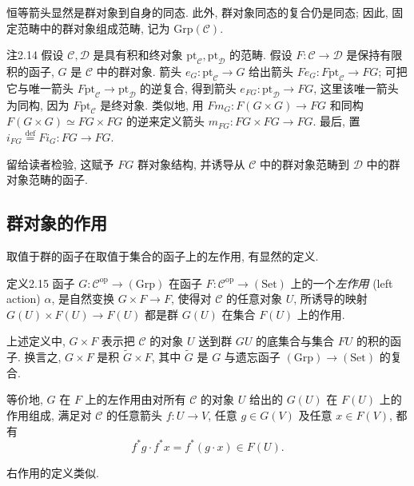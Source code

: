 恒等箭头显然是群对象到自身的同态. 此外, 群对象同态的复合仍是同态; 因此, 固定范畴中的群对象组成范畴, 记为 $\mathrm{Grp}(\mathcal C)$.

\begin{origstatement}{注}{2.14}\label{ch02:rem214}
假设 $\mathcal C,\mathcal D$ 是具有积和终对象 $\mathrm{pt}_{\mathcal C},\mathrm{pt}_{\mathcal D}$ 的范畴. 假设 $F:\mathcal C\to\mathcal D$ 是保持有限积的函子, $G$ 是 $\mathcal C$ 中的群对象. 箭头 $e_G:\mathrm{pt}_{\mathcal C}\to G$ 给出箭头 $Fe_G:F\mathrm{pt}_{\mathcal C}\to FG$; 可把它与唯一箭头 $F\mathrm{pt}_{\mathcal C}\to\mathrm{pt}_{\mathcal D}$ 的逆复合, 得到箭头 $e_{FG}:\mathrm{pt}_{\mathcal D}\to FG$, 这里该唯一箭头为同构, 因为 $F\mathrm{pt}_{\mathcal C}$ 是终对象. 类似地, 用 $Fm_G:F(G\times G)\to FG$ 和同构 $F(G\times G)\simeq FG\times FG$ 的逆来定义箭头 $m_{FG}:FG\times FG\to FG$. 最后, 置 $i_{FG}\overset{\mathrm{def}}=Fi_G:FG\to FG$.

留给读者检验, 这赋予 $FG$ 群对象结构, 并诱导从 $\mathcal C$ 中的群对象范畴到 $\mathcal D$ 中的群对象范畴的函子.
\end{origstatement}

\subsection{群对象的作用}\label{ch02:sec221}
取值于群的函子在取值于集合的函子上的左作用, 有显然的定义.

\begin{origstatement}{定义}{2.15}\label{ch02:def215}
函子 $G:\mathcal C^{\mathrm{op}}\to(\mathrm{Grp})$ 在函子 $F:\mathcal C^{\mathrm{op}}\to(\mathrm{Set})$ 上的一个\emph{左作用} (left action) $\alpha$, 是自然变换 $G\times F\to F$, 使得对 $\mathcal C$ 的任意对象 $U$, 所诱导的映射 $G(U)\times F(U)\to F(U)$ 都是群 $G(U)$ 在集合 $F(U)$ 上的作用.
\end{origstatement}

上述定义中, $G\times F$ 表示把 $\mathcal C$ 的对象 $U$ 送到群 $GU$ 的底集合与集合 $FU$ 的积的函子. 换言之, $G\times F$ 是积 $\widetilde G\times F$, 其中 $\widetilde G$ 是 $G$ 与遗忘函子 $(\mathrm{Grp})\to(\mathrm{Set})$ 的复合.

等价地, $G$ 在 $F$ 上的左作用由对所有 $\mathcal C$ 的对象 $U$ 给出的 $G(U)$ 在 $F(U)$ 上的作用组成, 满足对 $\mathcal C$ 的任意箭头 $f:U\to V$, 任意 $g\in G(V)$ 及任意 $x\in F(V)$, 都有
\[
f^*g\cdot f^*x=f^*(g\cdot x)\in F(U).
\]

右作用的定义类似.

